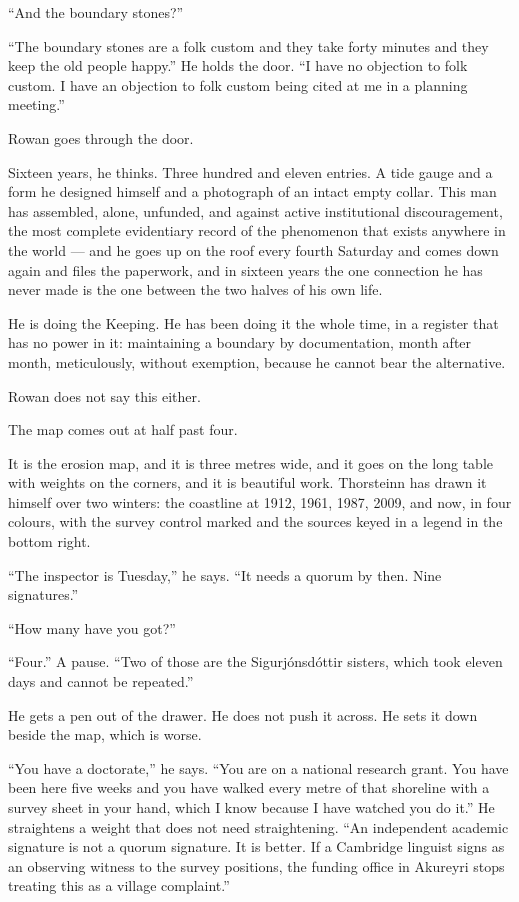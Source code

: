 \documentclass[11pt,oneside]{book}
\newcommand{\sceneline}{%
  \par\vspace{1.2em}
  \begin{center}
    \fontsize{11}{11}\selectfont \textbullet\quad\textbullet\quad\textbullet
  \end{center}
  \vspace{0.6em}\noindent\ignorespaces
}
\begin{document}
``And the boundary stones?''

``The boundary stones are a folk custom and they take forty minutes and
they keep the old people happy.'' He holds the door. ``I have no
objection to folk custom. I have an objection to folk custom being cited
at me in a planning meeting.''

Rowan goes through the door.

Sixteen years, he thinks. Three hundred and eleven entries. A tide gauge
and a form he designed himself and a photograph of an intact empty
collar. This man has assembled, alone, unfunded, and against active
institutional discouragement, the most complete evidentiary record of
the phenomenon that exists anywhere in the world --- and he goes up on
the roof every fourth Saturday and comes down again and files the
paperwork, and in sixteen years the one connection he has never made is
the one between the two halves of his own life.

He is doing the Keeping. He has been doing it the whole time, in a
register that has no power in it: maintaining a boundary by documentation,
month after month, meticulously, without exemption, because he cannot
bear the alternative.

Rowan does not say this either.

\sceneline

The map comes out at half past four.

It is the erosion map, and it is three metres wide, and it goes on the
long table with weights on the corners, and it is beautiful work.
Thorsteinn has drawn it himself over two winters: the coastline at
1912, 1961, 1987, 2009, and now, in four colours, with the survey
control marked and the sources keyed in a legend in the bottom right.

``The inspector is Tuesday,'' he says. ``It needs a quorum by then.
Nine signatures.''

``How many have you got?''

``Four.'' A pause. ``Two of those are the Sigurjónsdóttir sisters, which
took eleven days and cannot be repeated.''

He gets a pen out of the drawer. He does not push it across. He sets it
down beside the map, which is worse.

``You have a doctorate,'' he says. ``You are on a national research
grant. You have been here five weeks and you have walked every metre of
that shoreline with a survey sheet in your hand, which I know because I
have watched you do it.'' He straightens a weight that does not need
straightening. ``An independent academic signature is not a quorum
signature. It is better. If a Cambridge linguist signs as an observing
witness to the survey positions, the funding office in Akureyri stops
treating this as a village complaint.''
\end{document}
